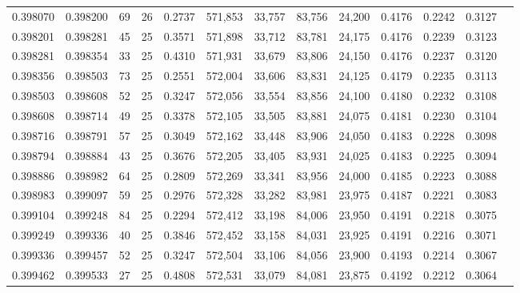 \begin{tabular}{rrrrrrrrrrrrr}
0.398070 & 0.398200 &    69 &  26 &                                     0.2737 & 571,853 &  33,757 &  83,756 &  24,200 & 0.4176 & 0.2242 & 0.3127 \\
0.398201 & 0.398281 &    45 &  25 &                                     0.3571 & 571,898 &  33,712 &  83,781 &  24,175 & 0.4176 & 0.2239 & 0.3123 \\
0.398281 & 0.398354 &    33 &  25 &                                     0.4310 & 571,931 &  33,679 &  83,806 &  24,150 & 0.4176 & 0.2237 & 0.3120 \\
0.398356 & 0.398503 &    73 &  25 &                                     0.2551 & 572,004 &  33,606 &  83,831 &  24,125 & 0.4179 & 0.2235 & 0.3113 \\
0.398503 & 0.398608 &    52 &  25 &                                     0.3247 & 572,056 &  33,554 &  83,856 &  24,100 & 0.4180 & 0.2232 & 0.3108 \\
0.398608 & 0.398714 &    49 &  25 &                                     0.3378 & 572,105 &  33,505 &  83,881 &  24,075 & 0.4181 & 0.2230 & 0.3104 \\
0.398716 & 0.398791 &    57 &  25 &                                     0.3049 & 572,162 &  33,448 &  83,906 &  24,050 & 0.4183 & 0.2228 & 0.3098 \\
0.398794 & 0.398884 &    43 &  25 &                                     0.3676 & 572,205 &  33,405 &  83,931 &  24,025 & 0.4183 & 0.2225 & 0.3094 \\
0.398886 & 0.398982 &    64 &  25 &                                     0.2809 & 572,269 &  33,341 &  83,956 &  24,000 & 0.4185 & 0.2223 & 0.3088 \\
0.398983 & 0.399097 &    59 &  25 &                                     0.2976 & 572,328 &  33,282 &  83,981 &  23,975 & 0.4187 & 0.2221 & 0.3083 \\
0.399104 & 0.399248 &    84 &  25 &                                     0.2294 & 572,412 &  33,198 &  84,006 &  23,950 & 0.4191 & 0.2218 & 0.3075 \\
0.399249 & 0.399336 &    40 &  25 &                                     0.3846 & 572,452 &  33,158 &  84,031 &  23,925 & 0.4191 & 0.2216 & 0.3071 \\
0.399336 & 0.399457 &    52 &  25 &                                     0.3247 & 572,504 &  33,106 &  84,056 &  23,900 & 0.4193 & 0.2214 & 0.3067 \\
0.399462 & 0.399533 &    27 &  25 &                                     0.4808 & 572,531 &  33,079 &  84,081 &  23,875 & 0.4192 & 0.2212 & 0.3064 \\

\end{tabular}
